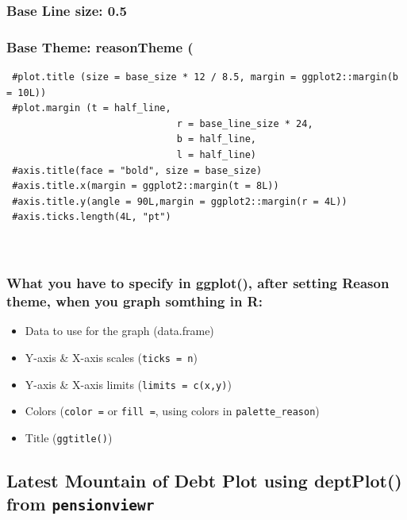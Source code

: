 \documentclass[
]{article}
\providecommand{\tightlist}{%
  \setlength{\itemsep}{0pt}\setlength{\parskip}{0pt}}
\begin{document}
\hypertarget{base-line-size-0.5}{%
\subsubsection{Base Line size: 0.5}\label{base-line-size-0.5}}

\hypertarget{base-theme-reasontheme}{%
\subsubsection{Base Theme: reasonTheme (}\label{base-theme-reasontheme}}

\begin{verbatim}
 #plot.title (size = base_size * 12 / 8.5, margin = ggplot2::margin(b = 10L))
 #plot.margin (t = half_line,
                              r = base_line_size * 24,
                              b = half_line,
                              l = half_line)
 #axis.title(face = "bold", size = base_size)
 #axis.title.x(margin = ggplot2::margin(t = 8L))
 #axis.title.y(angle = 90L,margin = ggplot2::margin(r = 4L))
 #axis.ticks.length(4L, "pt")
  
                
\end{verbatim}

\hypertarget{what-you-have-to-specify-in-ggplot-after-setting-reason-theme-when-you-graph-somthing-in-r}{%
\subsubsection{What you have to specify in ggplot(), after setting
Reason theme, when you graph somthing in
R:}\label{what-you-have-to-specify-in-ggplot-after-setting-reason-theme-when-you-graph-somthing-in-r}}

\begin{itemize}
\tightlist
\item
  Data to use for the graph (data.frame)
\item
  Y-axis \& X-axis scales (\texttt{ticks\ =\ n})
\item
  Y-axis \& X-axis limits (\texttt{limits\ =\ c(x,y)})
\item
  Colors (\texttt{color\ =} or \texttt{fill\ =}, using colors in
  \texttt{palette\_reason})
\item
  Title (\texttt{ggtitle()})
\end{itemize}

\hypertarget{latest-mountain-of-debt-plot-using-deptplot-from-pensionviewr}{%
\subsection{\texorpdfstring{Latest Mountain of Debt Plot using
deptPlot() from
\texttt{pensionviewr}}{Latest Mountain of Debt Plot using deptPlot() from pensionviewr}}\label{latest-mountain-of-debt-plot-using-deptplot-from-pensionviewr}}
\end{document}
